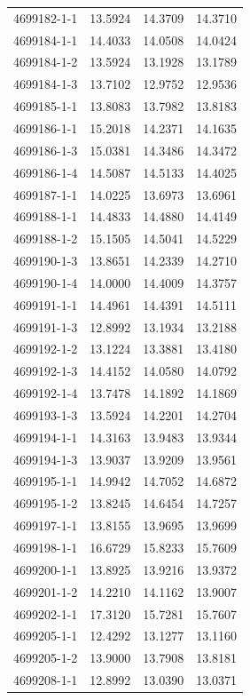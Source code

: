 \begin{longtable}{lrrr}
4699182-1-1 & 13.5924 & 14.3709 & 14.3710 \\
4699184-1-1 & 14.4033 & 14.0508 & 14.0424 \\
4699184-1-2 & 13.5924 & 13.1928 & 13.1789 \\
4699184-1-3 & 13.7102 & 12.9752 & 12.9536 \\
4699185-1-1 & 13.8083 & 13.7982 & 13.8183 \\
4699186-1-1 & 15.2018 & 14.2371 & 14.1635 \\
4699186-1-3 & 15.0381 & 14.3486 & 14.3472 \\
4699186-1-4 & 14.5087 & 14.5133 & 14.4025 \\
4699187-1-1 & 14.0225 & 13.6973 & 13.6961 \\
4699188-1-1 & 14.4833 & 14.4880 & 14.4149 \\
4699188-1-2 & 15.1505 & 14.5041 & 14.5229 \\
4699190-1-3 & 13.8651 & 14.2339 & 14.2710 \\
4699190-1-4 & 14.0000 & 14.4009 & 14.3757 \\
4699191-1-1 & 14.4961 & 14.4391 & 14.5111 \\
4699191-1-3 & 12.8992 & 13.1934 & 13.2188 \\
4699192-1-2 & 13.1224 & 13.3881 & 13.4180 \\
4699192-1-3 & 14.4152 & 14.0580 & 14.0792 \\
4699192-1-4 & 13.7478 & 14.1892 & 14.1869 \\
4699193-1-3 & 13.5924 & 14.2201 & 14.2704 \\
4699194-1-1 & 14.3163 & 13.9483 & 13.9344 \\
4699194-1-3 & 13.9037 & 13.9209 & 13.9561 \\
4699195-1-1 & 14.9942 & 14.7052 & 14.6872 \\
4699195-1-2 & 13.8245 & 14.6454 & 14.7257 \\
4699197-1-1 & 13.8155 & 13.9695 & 13.9699 \\
4699198-1-1 & 16.6729 & 15.8233 & 15.7609 \\
4699200-1-1 & 13.8925 & 13.9216 & 13.9372 \\
4699201-1-2 & 14.2210 & 14.1162 & 13.9007 \\
4699202-1-1 & 17.3120 & 15.7281 & 15.7607 \\
4699205-1-1 & 12.4292 & 13.1277 & 13.1160 \\
4699205-1-2 & 13.9000 & 13.7908 & 13.8181 \\
4699208-1-1 & 12.8992 & 13.0390 & 13.0371 \\

\end{longtable}
